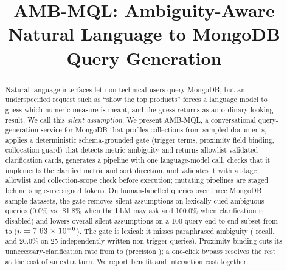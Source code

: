\title{AMB-MQL: Ambiguity-Aware Natural Language to MongoDB Query Generation}
\author{
    \and
    \and
}
\maketitle

\begin{abstract}
Natural-language interfaces let non-technical users query MongoDB, but an underspecified request such as ``show the top products'' forces a language model to guess which numeric measure is meant, and the guess returns as an ordinary-looking result. We call this \emph{silent assumption}. We present AMB-MQL, a conversational query-generation service for MongoDB that profiles collections from sampled documents, applies a deterministic schema-grounded gate (trigger terms, proximity field binding, collocation guard) that detects metric ambiguity and returns allowlist-validated clarification cards, generates a pipeline with one language-model call, checks that it implements the clarified metric and sort direction, and validates it with a stage allowlist and collection-scope check before execution; mutating pipelines are staged behind single-use signed tokens. On \numTotalQueries{} human-labelled queries over three MongoDB sample datasets, the gate removes silent assumptions on lexically cued ambiguous queries (0.0\% vs.\ 81.8\% when the LLM may ask and 100.0\% when clarification is disabled) and lowers overall silent assumptions on a 100-query end-to-end subset from \eTwoECZeroBSilentAmb{} to \eTwoECTwoSilentAmb{} ($p = 7.63\times 10^{-6}{}$). The gate is lexical: it misses paraphrased ambiguity (\gateRecallParaphrase{} recall, and 20.0\% on 25 independently written non-trigger queries). Proximity binding cuts its unnecessary-clarification rate from \gateBaseUCR{} to \gateUCR{} (precision \gatePrecision{}); a one-click bypass resolves the rest at the cost of an extra turn. We report benefit and interaction cost together.
\end{abstract}


